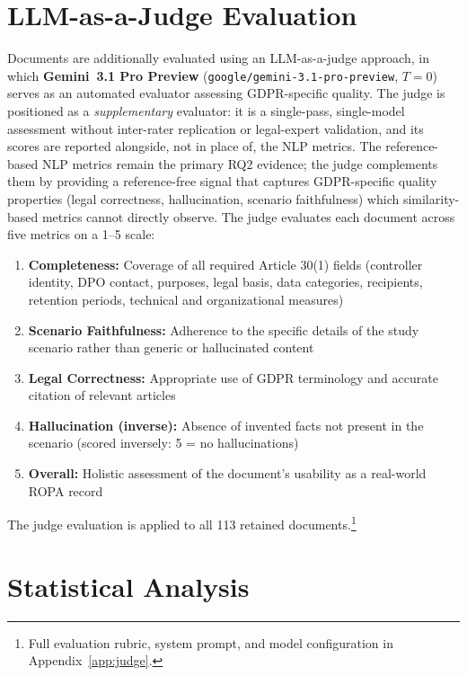 \section{LLM-as-a-Judge Evaluation}
Documents are additionally evaluated using an LLM-as-a-judge approach, in which \textbf{Gemini~3.1 Pro Preview} (\texttt{google/gemini-3.1-pro-preview}, $T = 0$) serves as an automated evaluator assessing GDPR-specific quality. The judge is positioned as a \emph{supplementary} evaluator: it is a single-pass, single-model assessment without inter-rater replication or legal-expert validation, and its scores are reported alongside, not in place of, the NLP metrics. The reference-based NLP metrics remain the primary RQ2 evidence; the judge complements them by providing a reference-free signal that captures GDPR-specific quality properties (legal correctness, hallucination, scenario faithfulness) which similarity-based metrics cannot directly observe. The judge evaluates each document across five metrics on a 1--5 scale:
\begin{enumerate}
    \item \textbf{Completeness:} Coverage of all required Article 30(1) fields (controller identity, DPO contact, purposes, legal basis, data categories, recipients, retention periods, technical and organizational measures)
    \item \textbf{Scenario Faithfulness:} Adherence to the specific details of the study scenario rather than generic or hallucinated content
    \item \textbf{Legal Correctness:} Appropriate use of GDPR terminology and accurate citation of relevant articles
    \item \textbf{Hallucination (inverse):} Absence of invented facts not present in the scenario (scored inversely: 5 = no hallucinations)
    \item \textbf{Overall:} Holistic assessment of the document's usability as a real-world ROPA record
\end{enumerate}
The judge evaluation is applied to all 113 retained documents.\footnote{Full evaluation rubric, system prompt, and model configuration in Appendix~\ref{app:judge}.}

\section{Statistical Analysis}
\label{sec:stat-analysis}


